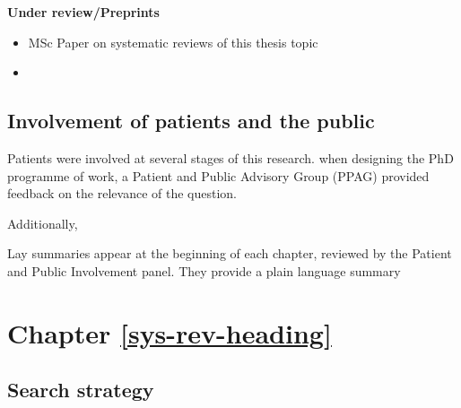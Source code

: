 \documentclass[a4paper, twoside]{templates/ociamthesis}
\begin{document}
\textbf{Under review/Preprints}

\begin{itemize}
\item
  MSc Paper on systematic reviews of this thesis topic
\item
\end{itemize}

\hypertarget{appendix-ppi}{%
\subsection{Involvement of patients and the public}\label{appendix-ppi}}

Patients were involved at several stages of this research. when designing the PhD programme of work, a Patient and Public Advisory Group (PPAG) provided feedback on the relevance of the question.

Additionally,

Lay summaries appear at the beginning of each chapter, reviewed by the Patient and Public Involvement panel. They provide a plain language summary

\hypertarget{appendix-sys-rev}{%
\section{Chapter \ref{sys-rev-heading}}\label{appendix-sys-rev}}

\hypertarget{appendix-search-strategy}{%
\subsection{Search strategy}\label{appendix-search-strategy}}

~
\end{document}
